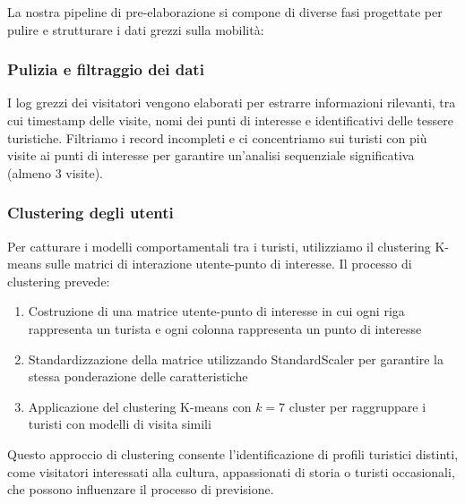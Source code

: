 La nostra pipeline di pre-elaborazione si compone di diverse fasi progettate per pulire e strutturare i dati grezzi sulla mobilità:

\subsubsection{Pulizia e filtraggio dei dati}
I log grezzi dei visitatori vengono elaborati per estrarre informazioni rilevanti, tra cui timestamp delle visite, nomi dei punti di interesse e identificativi delle tessere turistiche. Filtriamo i record incompleti e ci concentriamo sui turisti con più visite ai punti di interesse per garantire un'analisi sequenziale significativa (almeno 3 visite).

\subsubsection{Clustering degli utenti}
Per catturare i modelli comportamentali tra i turisti, utilizziamo il clustering K-means sulle matrici di interazione utente-punto di interesse. Il processo di clustering prevede:

\begin{enumerate}
\item Costruzione di una matrice utente-punto di interesse in cui ogni riga rappresenta un turista e ogni colonna rappresenta un punto di interesse
\item Standardizzazione della matrice utilizzando StandardScaler per garantire la stessa ponderazione delle caratteristiche
\item Applicazione del clustering K-means con $k=7$ cluster per raggruppare i turisti con modelli di visita simili
\end{enumerate}

Questo approccio di clustering consente l'identificazione di profili turistici distinti, come visitatori interessati alla cultura, appassionati di storia o turisti occasionali, che possono influenzare il processo di previsione.


